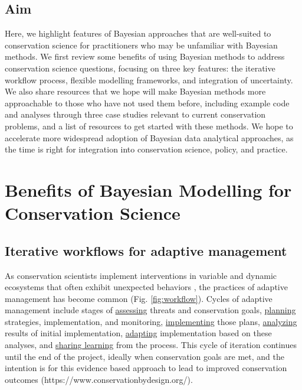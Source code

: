 \documentclass{article}
\begin{document}
\subsection*{Aim} Here,  we highlight features of Bayesian approaches that are well-suited to conservation science for practitioners who may be unfamiliar with Bayesian methods. We first review some benefits of using Bayesian methods to address conservation science questions, focusing on three key features: the iterative workflow process, flexible modelling frameworks, and integration of uncertainty. We also share resources that we hope will make Bayesian methods more approachable to those who have not used them before, including example code and analyses through three case studies relevant to current conservation problems, and a list of resources to get started with these methods. We hope to accelerate more widespread adoption of Bayesian data analytical approaches, as the time is right for integration into conservation science, policy, and practice. 

\section* {Benefits of Bayesian Modelling for Conservation Science}
\subsection*{Iterative workflows for adaptive management}
\par As conservation scientists implement interventions in variable and dynamic ecosystems that often exhibit unexpected behaviors \citep{Levin2012,Gross2013}, the practices of adaptive management has become common \citep{holling1978adaptive} (Fig. \ref{fig:workflow}). Cycles of adaptive management include stages of \underline{assessing} threats and conservation goals, \underline{planning} strategies, implementation, and monitoring, \underline{implementing} those plans, \underline{analyzing} results of initial implementation, \underline{adapting} implementation based on these analyses, and \underline{sharing learning} from the process. This cycle of iteration continues until the end of the project, ideally when conservation goals are met, and the intention is for this evidence based approach to lead to improved conservation outcomes (https://www.conservationbydesign.org/).
\end{document}
